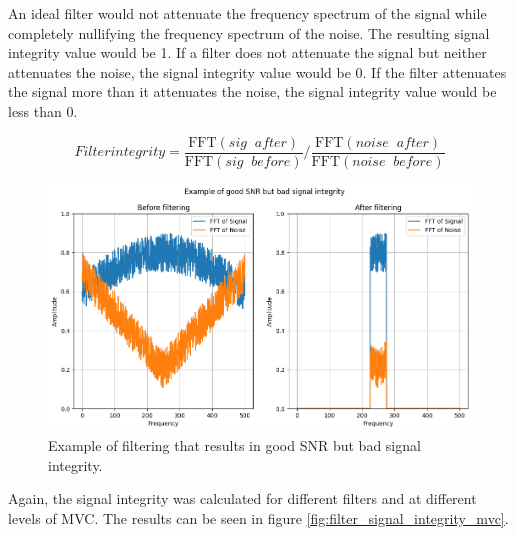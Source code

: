 An ideal filter would not attenuate the frequency spectrum of the signal while completely nullifying the frequency spectrum of the noise. The resulting signal integrity value would be 1. If a filter does not attenuate the signal but neither attenuates the noise, the signal integrity value would be 0. If the filter attenuates the signal more than it attenuates the noise, the signal integrity value would be less than 0.

\begin{equation}
    Filter integrity = \frac{\text{FFT}(sig \;\; after)}{\text{FFT}(sig \;\;  before)} / \frac{\text{FFT}(noise \;\;  after)}{\text{FFT}(noise \;\;  before)}
    \label{eq:signal_integrity}
\end{equation}

\begin{figure}[h!t]
	\begin{center}
		\includegraphics[width=1.0\columnwidth]{images/good_snr_bad_integrity.png}
	\end{center}
	\caption{Example of filtering that results in good SNR but bad signal integrity.}
	\label{fig:good_snr_bad_integrity}
\end{figure}

Again, the signal integrity was calculated for different filters and at different levels of MVC. The results can be seen in figure \ref{fig:filter_signal_integrity_mvc}.

